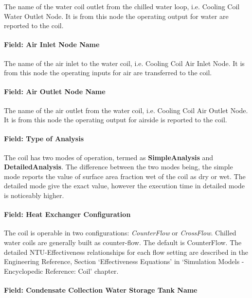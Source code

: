 The name of the water coil outlet from the chilled water loop, i.e. Cooling Coil Water Outlet Node. It is from this node the operating output for water are reported to the coil.

\paragraph{Field: Air Inlet Node Name}\label{field-air-inlet-node-name-003}

The name of the air inlet to the water coil, i.e. Cooling Coil Air Inlet Node. It is from this node the operating inputs for air are transferred to the coil.

\paragraph{Field: Air Outlet Node Name}\label{field-air-outlet-node-name-003}

The name of the air outlet from the water coil, i.e. Cooling Coil Air Outlet Node. It is from this node the operating output for airside is reported to the coil.

\paragraph{Field: Type of Analysis}\label{field-type-of-analysis}

The coil has two modes of operation, termed as \textbf{SimpleAnalysis} and \textbf{DetailedAnalysis}. The difference between the two modes being, the simple mode reports the value of surface area fraction wet of the coil as dry or wet. The detailed mode give the exact value, however the execution time in detailed mode is noticeably higher.

\paragraph{Field: Heat Exchanger Configuration}\label{field-heat-exchanger-configuration-000}

The coil is operable in two configurations: \textit{CounterFlow} or \textit{CrossFlow}. Chilled water coils are generally built as counter-flow. The default is CounterFlow. The detailed NTU-Effectiveness relationships for each flow setting are described in the Engineering Reference, Section `Effectiveness Equations' in `Simulation Models - Encyclopedic Reference: Coil' chapter.

\paragraph{Field: Condensate Collection Water Storage Tank Name}\label{field-condensate-collection-water-storage-tank-name}

